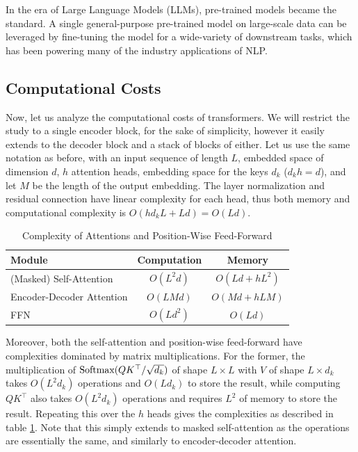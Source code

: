 In the era of Large Language Models (LLMs), pre-trained models became the standard. A single general-purpose pre-trained model on large-scale data can be leveraged by fine-tuning the model for a wide-variety of downstream tasks, which has been powering many of the industry applications of NLP.

\subsection{Computational Costs}
Now, let us analyze the computational costs of transformers. We will restrict the study to a single encoder block, for the sake of simplicity, however it easily extends to the decoder block and a stack of blocks of either. Let us use the same notation as before, with an input sequence of length $L$, embedded space of dimension $d$, $h$ attention heads, embedding space for the keys $d_k$ ($d_k h = d$), and let $M$ be the length of the output embedding. The layer normalization and residual connection have linear complexity for each head, thus both memory and computational complexity is $O(h d_k L + Ld) = O(Ld)$.

\begin{table}[ht!]
\centering
\begin{tabular}{l c c} 
 \hline
    Module & Computation & Memory \\ [0.5ex] 
 \hline
 (Masked) Self-Attention & $O(L^2d)$ & $O(Ld + hL^2)$ \\ 
 
 Encoder-Decoder Attention & $O(LMd)$ & $O(Md + hLM)$ \\
 
 FFN & $O(Ld^2)$ & $O(Ld)$ \\

 \hline
\end{tabular}
\caption{Complexity of Attentions and Position-Wise Feed-Forward}
\label{table:1}
\end{table}

Moreover, both the self-attention and position-wise feed-forward have complexities dominated by matrix multiplications. For the former, the multiplication of $\text{Softmax}(QK^\top / \sqrt{d_k})$ of shape $L \times L$  with $V$ of shape $L \times d_k$ takes $O(L^2d_k)$ operations and $O(Ld_k)$ to store the result, while computing $QK^\top$ also takes $O(L^2d_k)$ operations and requires $L^2$ of memory to store the result. Repeating this over the $h$ heads gives the complexities as described in table \ref{table:1}. Note that this simply extends to masked self-attention as the operations are essentially the same, and similarly to encoder-decoder attention.

